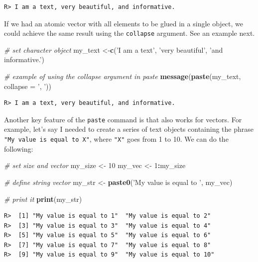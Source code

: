 \documentclass[
  12pt,
]{book}
\newenvironment{Shaded}{\begin{snugshade}}{\end{snugshade}}
\newcommand{\CommentTok}[1]{\textcolor[rgb]{0.37,0.37,0.37}{\textit{#1}}}
\newcommand{\DataTypeTok}[1]{\textcolor[rgb]{0.27,0.27,0.27}{#1}}
\newcommand{\DecValTok}[1]{\textcolor[rgb]{0.06,0.06,0.06}{#1}}
\newcommand{\KeywordTok}[1]{\textcolor[rgb]{0.27,0.27,0.27}{\textbf{#1}}}
\newcommand{\NormalTok}[1]{#1}
\newcommand{\OperatorTok}[1]{\textcolor[rgb]{0.43,0.43,0.43}{\textbf{#1}}}
\newcommand{\StringTok}[1]{\textcolor[rgb]{0.5,0.5,0.5}{#1}}
\begin{document}
\begin{verbatim}
R> I am a text, very beautiful, and informative.
\end{verbatim}

If we had an atomic vector with all elements to be glued in a single object, we could achieve the same result using the \texttt{collapse} argument. See an example next.

\begin{Shaded}
\begin{Highlighting}[]
\CommentTok{# set character object}
\NormalTok{my_text <-}\KeywordTok{c}\NormalTok{(}\StringTok{'I am a text'}\NormalTok{, }\StringTok{'very beautiful'}\NormalTok{, }\StringTok{'and informative.'}\NormalTok{)}

\CommentTok{# example of using the collapse argument in paste}
\KeywordTok{message}\NormalTok{(}\KeywordTok{paste}\NormalTok{(my_text, }\DataTypeTok{collapse =} \StringTok{', '}\NormalTok{))}
\end{Highlighting}
\end{Shaded}

\begin{verbatim}
R> I am a text, very beautiful, and informative.
\end{verbatim}

Another key feature of the \texttt{paste} command is that also works for vectors. For example, let's say I needed to create a series of text objects containing the phrase \texttt{"My\ value\ is\ equal\ to\ X"}, where \texttt{"X"} goes from 1 to 10. We can do the following:

\begin{Shaded}
\begin{Highlighting}[]
\CommentTok{# set size and vector}
\NormalTok{my_size <-}\StringTok{ }\DecValTok{10}
\NormalTok{my_vec <-}\StringTok{ }\DecValTok{1}\OperatorTok{:}\NormalTok{my_size}

\CommentTok{# define string vector}
\NormalTok{my_str <-}\StringTok{ }\KeywordTok{paste0}\NormalTok{(}\StringTok{'My value is equal to '}\NormalTok{, my_vec)}

\CommentTok{# print it}
\KeywordTok{print}\NormalTok{(my_str)}
\end{Highlighting}
\end{Shaded}

\begin{verbatim}
R>  [1] "My value is equal to 1"  "My value is equal to 2" 
R>  [3] "My value is equal to 3"  "My value is equal to 4" 
R>  [5] "My value is equal to 5"  "My value is equal to 6" 
R>  [7] "My value is equal to 7"  "My value is equal to 8" 
R>  [9] "My value is equal to 9"  "My value is equal to 10"
\end{verbatim}
\end{document}
